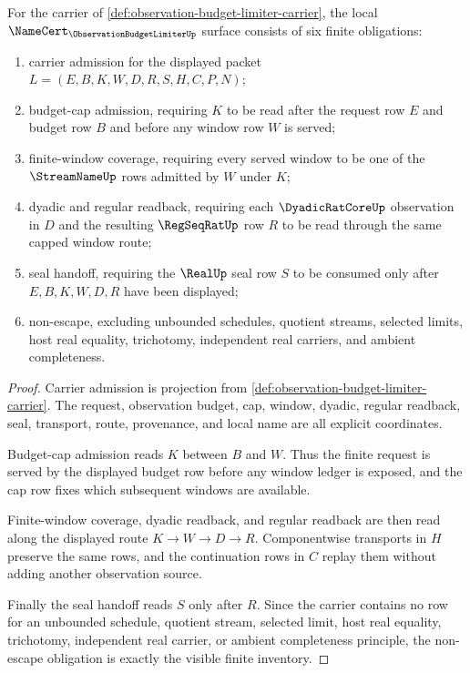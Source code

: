 \begin{theorem}
\label{thm:observation-budget-limiter-namecert-obligations}
For the carrier of \autoref{def:observation-budget-limiter-carrier}, the local $\NameCert_{\ObservationBudgetLimiterUp}$ surface consists of six finite obligations:
\begin{enumerate}
\item carrier admission for the displayed packet $L=(E,B,K,W,D,R,S,H,C,P,N)$;
\item budget-cap admission, requiring $K$ to be read after the request row $E$ and budget row $B$ and before any window row $W$ is served;
\item finite-window coverage, requiring every served window to be one of the $\StreamNameUp$ rows admitted by $W$ under $K$;
\item dyadic and regular readback, requiring each $\DyadicRatCoreUp$ observation in $D$ and the resulting $\RegSeqRatUp$ row $R$ to be read through the same capped window route;
\item seal handoff, requiring the $\RealUp$ seal row $S$ to be consumed only after $E,B,K,W,D,R$ have been displayed;
\item non-escape, excluding unbounded schedules, quotient streams, selected limits, host real equality, trichotomy, independent real carriers, and ambient completeness.
\end{enumerate}
\end{theorem}
\begin{proof}
Carrier admission is projection from \autoref{def:observation-budget-limiter-carrier}. The request, observation budget, cap, window, dyadic, regular readback, seal, transport, route, provenance, and local name are all explicit coordinates.

Budget-cap admission reads $K$ between $B$ and $W$. Thus the finite request is served by the displayed budget row before any window ledger is exposed, and the cap row fixes which subsequent windows are available.

Finite-window coverage, dyadic readback, and regular readback are then read along the displayed route $K \to W \to D \to R$. Componentwise transports in $H$ preserve the same rows, and the continuation rows in $C$ replay them without adding another observation source.

Finally the seal handoff reads $S$ only after $R$. Since the carrier contains no row for an unbounded schedule, quotient stream, selected limit, host real equality, trichotomy, independent real carrier, or ambient completeness principle, the non-escape obligation is exactly the visible finite inventory.
\end{proof}

